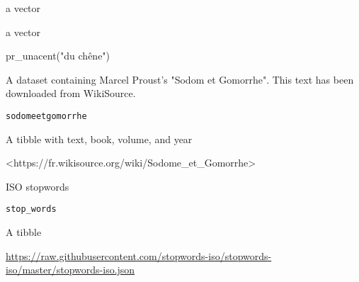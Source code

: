 \documentclass[a4paper]{book}
\begin{document}
%
\begin{Arguments}
\begin{ldescription}
\item[\code{text}] a vector
\end{ldescription}
\end{Arguments}
%
\begin{Value}
a vector
\end{Value}
%
\begin{Examples}
\begin{ExampleCode}
pr_unacent("du chêne")
\end{ExampleCode}
\end{Examples}
%
\begin{Description}\relax
A dataset containing Marcel Proust's "Sodom et Gomorrhe". 
This text has been downloaded from WikiSource.
\end{Description}
%
\begin{Usage}
\begin{verbatim}
sodomeetgomorrhe
\end{verbatim}
\end{Usage}
%
\begin{Format}
A tibble with text, book, volume, and year
\end{Format}
%
\begin{Source}\relax
<https://fr.wikisource.org/wiki/Sodome\_et\_Gomorrhe>
\end{Source}
%
\begin{Description}\relax
ISO stopwords
\end{Description}
%
\begin{Usage}
\begin{verbatim}
stop_words
\end{verbatim}
\end{Usage}
%
\begin{Format}
A tibble
\end{Format}
%
\begin{Source}\relax
\url{https://raw.githubusercontent.com/stopwords-iso/stopwords-iso/master/stopwords-iso.json}
\end{Source}
\printindex{}
\end{document}
